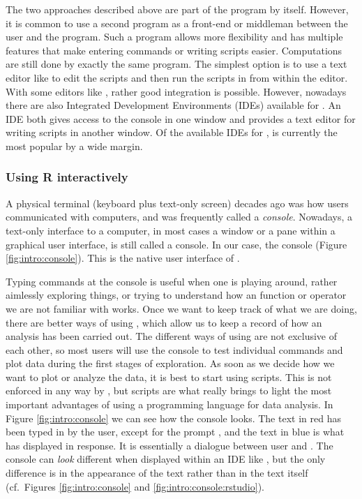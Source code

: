 \documentclass[krantz2]{krantz}\usepackage{knitr}
\begin{document}
The two approaches described above are part of the \Rpgrm program by itself. However, it is common to use a second program as a front-end or middleman between the user and the \Rpgrm program. Such a program allows more flexibility and has multiple features that make entering commands or writing scripts easier. Computations are still done by exactly the same \Rpgrm program. The simplest option is to use a text editor like  to edit the scripts and then run the scripts in \Rpgrm from within the editor. With some editors like , rather good integration is possible. However, nowadays there are also Integrated Development Environments (IDEs) available for \Rpgrm. An IDE both gives access to the \Rpgrm console in one window and provides a text editor for writing scripts in another window. Of the available IDEs for \Rpgrm, \RStudio is currently the most popular by a wide margin.

\subsubsection{Using R interactively}

A physical terminal (keyboard plus text-only screen) decades ago was how users communicated with computers, and was frequently called a \emph{console}. Nowadays, a text-only interface to a computer, in most cases a window or a pane within a graphical user interface, is still called a console. In our case, the \Rpgrm console (Figure \ref{fig:intro:console}). This is the native user interface of \Rpgrm.

Typing commands at the \Rpgrm console is useful when one is playing around, rather aimlessly exploring things, or trying to understand how an \Rpgrm function or operator we are not familiar with works. Once we want to keep track of what we are doing, there are better ways of using \Rpgrm, which allow us to keep a record of how an analysis has been carried out. The different ways of using \Rpgrm are not exclusive of each other, so most users will use the \Rpgrm console to test individual commands and plot data during the first stages of exploration. As soon as we decide how we want to plot or analyze the data, it is best to start using scripts. This is not enforced in any way by \Rpgrm, but scripts are what really brings to light the most important advantages of using a programming language for data analysis. In Figure \ref{fig:intro:console} we can see how the \Rpgrm console looks. The text in red has been typed in by the user, except for the prompt \code{\textcolor{red}{$>$}}, and the text in blue is what \Rpgrm has displayed in response. It is essentially a dialogue between user and \Rpgrm. The console can \emph{look} different when displayed within an IDE like \RStudio, but the only difference is in the appearance of the text rather than in the text itself (cf.\ Figures \ref{fig:intro:console} and \ref{fig:intro:console:rstudio}).
\end{document}
